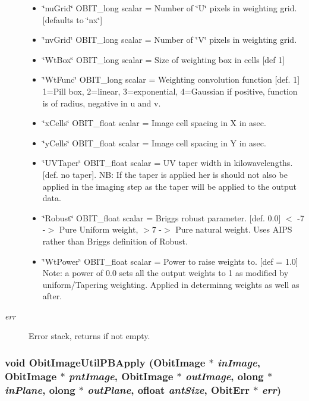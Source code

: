 \begin{Desc}
\begin{description}
\begin{itemize}
\item \char`\"{}nu\-Grid\char`\"{} OBIT\_\-long scalar = Number of \char`\"{}U\char`\"{} pixels in weighting grid. [defaults to \char`\"{}nx\char`\"{}] \item \char`\"{}nv\-Grid\char`\"{} OBIT\_\-long scalar = Number of \char`\"{}V\char`\"{} pixels in weighting grid. \item \char`\"{}Wt\-Box\char`\"{} OBIT\_\-long scalar = Size of weighting box in cells [def 1] \item \char`\"{}Wt\-Func\char`\"{} OBIT\_\-long scalar = Weighting convolution function [def. 1] 1=Pill box, 2=linear, 3=exponential, 4=Gaussian if positive, function is of radius, negative in u and v. \item \char`\"{}x\-Cells\char`\"{} OBIT\_\-float scalar = Image cell spacing in X in asec. \item \char`\"{}y\-Cells\char`\"{} OBIT\_\-float scalar = Image cell spacing in Y in asec. \item \char`\"{}UVTaper\char`\"{} OBIT\_\-float scalar = UV taper width in kilowavelengths. [def. no taper]. NB: If the taper is applied her is should not also be applied in the imaging step as the taper will be applied to the output data. \item \char`\"{}Robust\char`\"{} OBIT\_\-float scalar = Briggs robust parameter. [def. 0.0] $<$ -7 -$>$ Pure Uniform weight, $>$7 -$>$ Pure natural weight. Uses AIPS rather than Briggs definition of Robust. \item \char`\"{}Wt\-Power\char`\"{} OBIT\_\-float scalar = Power to raise weights to. [def = 1.0] Note: a power of 0.0 sets all the output weights to 1 as modified by uniform/Tapering weighting. Applied in determinng weights as well as after. \end{itemize}
\item[{\em err}]Error stack, returns if not empty. \end{description}
\end{Desc}
\subsubsection{\setlength{\rightskip}{0pt plus 5cm}void Obit\-Image\-Util\-PBApply ({\bf Obit\-Image} $\ast$ {\em in\-Image}, {\bf Obit\-Image} $\ast$ {\em pnt\-Image}, {\bf Obit\-Image} $\ast$ {\em out\-Image}, {\bf olong} $\ast$ {\em in\-Plane}, {\bf olong} $\ast$ {\em out\-Plane}, {\bf ofloat} {\em ant\-Size}, {\bf Obit\-Err} $\ast$ {\em err})}\label{ObitImageUtil_8h_a10}


